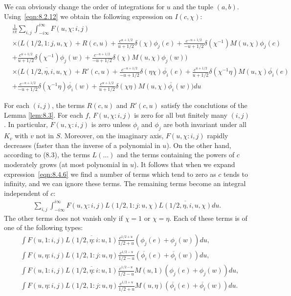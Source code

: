 We can obviously change the order of integrations for $u$ and the tuple $(a, b)$.
Using~\eqref{eqn:8.2.12} we obtain the following expression on $I(c, \chi)$:
\begin{equation}
\label{eqn:8.4.6}
\begin{aligned}
    &\frac{1}{i\pi} \sum_{i, j} \int_{-i\infty}^{i\infty} F(u, \chi: i, j) \\
    &\times \bigg( L(1/2, 1:j, u, \chi) + R(c, u) 
    + \frac{c^{u+ 1/2}}{u + 1/2}\delta(\chi)\phi_j(e)
    + \frac{c^{-u+1/2}}{-u+1/2}\delta(\chi^{-1})M(u, \chi)\phi_j(c) \\
    &+ \frac{c^{u+1/2}}{u + 1/2} \delta(\chi^{-1}) \phi_j(w) + \frac{c^{-u+1/2}}{-u+1/2} \delta(\chi) M(u, \chi) \phi_j(w) \bigg) \\
    &\times \bigg( \overline{L(1/2, \eta, i, u, \chi)} + R'(c, u) 
    + \frac{c^{-u+1/2}}{-u+1/2} \delta(\eta \chi)\overline{\phi_i}(e) 
    + \frac{c^{u+1/2}}{u + 1/2} \delta(\chi^{-1}\eta) M(u, \chi) \overline{\phi_i}(e) \\
    &+ \frac{c^{-u+1/2}}{-u+1/2}\delta(\chi^{-1}\eta)\overline{\phi_i}(w) + \frac{c^{u+1/2}}{u+1/2} \delta(\chi\eta) M(u, \chi)\overline{\phi_i}(w)\bigg) du
\end{aligned}
\end{equation}

For each $(i, j)$, the terms $R(c, u)$ and $R'(c, u)$ satisfy the conclutions of the Lemma \ref{lem:8.3}.
For each $f$,  $F(u, \chi: i, j)$ is zero for all but finitely many $(i, j)$. 
In particular, $F(u, \chi: i, j)$ is zero unless $\phi_i$ and $\phi_j$ are both invariant under all $K_v$ with $v$ not in $S $.
Moreover, on the imaginary axis, $F(u, \chi: i, j)$ rapidly decreases (faster than the inverse of a polynomial in $u$).
On the other hand, according to (8.3), the terms $L(\dots)$ and the terms containing the powers of $c$ moderately grows (at most polynomial in $u$).
It follows that when we expand expression~\eqref{eqn:8.4.6} we find a number of terms which tend to zero as $c$ tends to infinity, and we can ignore these terms.
The remaining terms become an  integral independent of $c$:
\begin{align}
    \label{eqn:8.4.7}
    \sum_{i, j}\int_{-i\infty}^{i\infty} F(u, \chi: i, j) L(1/2, 1:j:u, \chi) \overline{L(1/2, \eta, i, u, \chi)} du.
\end{align}
The other terms does not vanish only if $\chi=1$ or $\chi=\eta$.
Each of these terms is of one of the following types:
\begin{align}
    &\int F(u,1:i, j)\overline{L(1/2, \eta:i:u, 1)} \frac{c^{1/2+u}}{1/2+u}(\phi_j(e) + \phi_j(w))du, \label{eqn:8.4.8} \\
    &\int F(u, \eta:i, j) L(1/2, 1: j: u, \eta) \frac{c^{1/2-u}}{1/2-u} (\overline{\phi_i}(e) + \overline{\phi_i}(w)) du, \label{eqn:8.4.9} \\
    &\int F(u, 1:i, j) \overline{L(1/2, \eta:i:u, 1)} \frac{c^{1/2-u}}{1/2-u} M(u, 1)(\phi_j(e) +\phi_j(w)) du, \label{eqn:8.4.10}\\
    &\int F(u, \eta:i, j)L(1/2, 1:j:u, \eta) \frac{c^{1/2+u}}{1/2+u} M(u, \eta)(\overline{\phi_i}(e) +\overline{\phi_i}(w)) du. \label{eqn:8.4.11}
\end{align}

